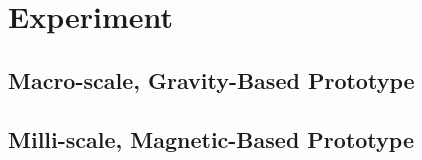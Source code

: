 \section{Experiment}\label{sec:Experiment}

\subsection{Macro-scale, Gravity-Based Prototype}

\subsection{Milli-scale, Magnetic-Based Prototype}